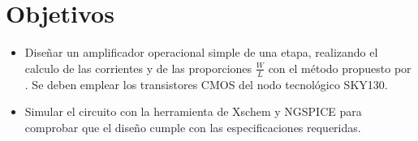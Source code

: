 \section{Objetivos \label{sec:obj}}


\begin{itemize} 
	\item Diseñar un amplificador operacional simple de una etapa, realizando el calculo de las corrientes y de las proporciones $\frac{W}{L}$ con el método propuesto por \cite{Allen_2012}. Se deben emplear los transistores CMOS del nodo tecnológico SKY130.
	\item Simular el circuito con la herramienta de Xschem y NGSPICE para comprobar que el diseño cumple con las especificaciones requeridas.	
\end{itemize}
